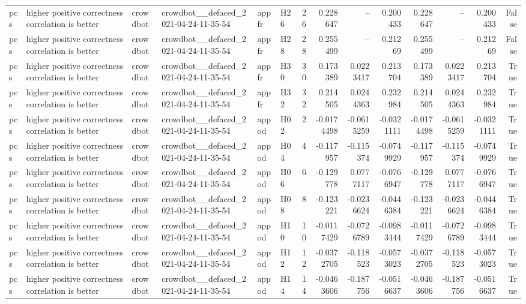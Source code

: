 \begin{longtable}{llllllrrrrrrrr}
pcs & higher positive correctness correlation is better & crowdbot & crowdbot\_\_defaced\_2021-04-24-11-35-54 & appfr & H26 & 26 & 0.228647 & -- & 0.200433 & 0.228647 & -- & 0.200433 & False \\
pcs & higher positive correctness correlation is better & crowdbot & crowdbot\_\_defaced\_2021-04-24-11-35-54 & appfr & H28 & 28 & 0.255499 & -- & 0.21269 & 0.255499 & -- & 0.21269 & False \\
pcs & higher positive correctness correlation is better & crowdbot & crowdbot\_\_defaced\_2021-04-24-11-35-54 & appfr & H30 & 30 & 0.173389 & 0.0223417 & 0.213704 & 0.173389 & 0.0223417 & 0.213704 & True \\
pcs & higher positive correctness correlation is better & crowdbot & crowdbot\_\_defaced\_2021-04-24-11-35-54 & appfr & H32 & 32 & 0.214505 & 0.0244363 & 0.232984 & 0.214505 & 0.0244363 & 0.232984 & True \\
pcs & higher positive correctness correlation is better & crowdbot & crowdbot\_\_defaced\_2021-04-24-11-35-54 & appod & H02 & 2 & -0.0174498 & -0.0615259 & -0.0321111 & -0.0174498 & -0.0615259 & -0.0321111 & True \\
pcs & higher positive correctness correlation is better & crowdbot & crowdbot\_\_defaced\_2021-04-24-11-35-54 & appod & H04 & 4 & -0.117957 & -0.115374 & -0.0749929 & -0.117957 & -0.115374 & -0.0749929 & True \\
pcs & higher positive correctness correlation is better & crowdbot & crowdbot\_\_defaced\_2021-04-24-11-35-54 & appod & H06 & 6 & -0.129778 & 0.0777117 & -0.0766947 & -0.129778 & 0.0777117 & -0.0766947 & True \\
pcs & higher positive correctness correlation is better & crowdbot & crowdbot\_\_defaced\_2021-04-24-11-35-54 & appod & H08 & 8 & -0.123221 & -0.0236624 & -0.0446384 & -0.123221 & -0.0236624 & -0.0446384 & True \\
pcs & higher positive correctness correlation is better & crowdbot & crowdbot\_\_defaced\_2021-04-24-11-35-54 & appod & H10 & 10 & -0.0117429 & -0.0726789 & -0.0983444 & -0.0117429 & -0.0726789 & -0.0983444 & True \\
pcs & higher positive correctness correlation is better & crowdbot & crowdbot\_\_defaced\_2021-04-24-11-35-54 & appod & H12 & 12 & -0.0372705 & -0.118523 & -0.0573023 & -0.0372705 & -0.118523 & -0.0573023 & True \\
pcs & higher positive correctness correlation is better & crowdbot & crowdbot\_\_defaced\_2021-04-24-11-35-54 & appod & H14 & 14 & -0.0463606 & -0.187756 & -0.0516637 & -0.0463606 & -0.187756 & -0.0516637 & True \\

\end{longtable}
